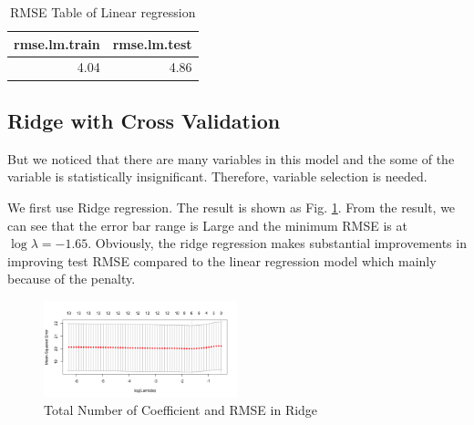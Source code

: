 \documentclass[conference]{IEEEtran}
\begin{document}
\begin{table}[ht]
\centering
\caption{RMSE Table of Linear regression}
\begin{tabular}{rr}
  \hline
rmse.lm.train & rmse.lm.test \\ 
  \hline
4.04 & 4.86 \\ 
   \hline
\end{tabular}
\label{RMSE Table of Linear regression}	
\end{table}
	


\subsection{Ridge with Cross Validation}
But we noticed that there are many variables in this model and the some of the variable is statistically insignificant. Therefore, variable selection is needed. 

We first use Ridge regression. The result is shown as Fig. \ref{Total Number of Coefficient and RMSE in Ridge}. From the result, we can see that the error bar range is Large and the minimum RMSE is at $\log\lambda=-1.65$. Obviously, the ridge regression makes substantial improvements in improving test RMSE compared to the linear regression model which mainly because of the penalty.

\begin{figure}[htbp]
\centerline{\includegraphics[width=0.5\textwidth]{figure/cvfitlasso.png}}
\caption{Total Number of Coefficient and RMSE in Ridge\protect\footnotemark}
\label{Total Number of Coefficient and RMSE in Ridge}
\end{figure}
\end{document}
